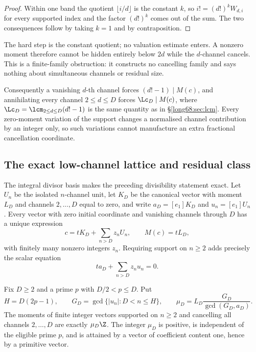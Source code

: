 \begin{proof}
Within one band the quotient $\lfloor i/d\rfloor$ is the constant $k$, so
$i!=(d!)^kW_{d,i}$ for every supported index and the factor $(d!)^k$ comes
out of the sum.  The two consequences follow by taking $k=1$ and by
contraposition.
\end{proof}

\noindent The hard step is the constant quotient; no valuation estimate
enters.  A nonzero moment therefore cannot be hidden entirely below $2d$
while the $d$-channel cancels.  This is a finite-family obstruction: it
constructs no cancelling family and says nothing about simultaneous channels
or residual size.

Consequently a vanishing $d$-th channel forces $(d!-1)\mid M(c)$,
and annihilating every channel $2\le d\le D$ forces $\Lc_D\mid M(c)$, where
$\Lc_D=\lcm_{2\le d\le D}(d!-1)$ is the same quantity as in
\S\ref{long68:sec:lcm}.  Every zero-moment variation of the support changes a
normalised channel contribution by an integer only, so such variations cannot
manufacture an extra fractional cancellation coordinate.

\subsection{The exact low-channel lattice and residual class}

The integral divisor basis makes the preceding divisibility statement exact.
Let $U_n$ be the isolated $n$-channel unit, let $K_D$ be the canonical vector
with moment $L_D$ and channels $2,\ldots,D$ equal to zero, and write
$a_D=[e_1]K_D$ and $u_n=[e_1]U_n$.  Every vector with zero initial coordinate
and vanishing channels through $D$ has a unique expression
\begin{equation}\label{long68:eq:low-channel-basis}
 c=tK_D+\sum_{n>D}z_nU_n,
 \qquad M(c)=tL_D,
\end{equation}
with finitely many nonzero integers $z_n$.  Requiring support on $n\ge2$
adds precisely the scalar equation
\begin{equation}\label{long68:eq:low-channel-support}
 ta_D+\sum_{n>D}z_nu_n=0.
\end{equation}

\begin{theorem}\label{long68:res:moment-ideal}
Fix $D\ge2$ and a prime $p$ with $D/2<p\le D$.  Put
\[
 H=D(2p-1),\qquad
 G_D=\gcd\{|u_n|:D<n\le H\},\qquad
 \mu_D=L_D\frac{G_D}{\gcd(G_D,a_D)}.
\]
The moments of finite integer vectors supported on $n\ge2$ and cancelling all
channels $2,\ldots,D$ are exactly $\mu_D\Z$.  The integer $\mu_D$ is positive,
is independent of the eligible prime $p$, and is attained by a vector of
coefficient content one, hence by a primitive vector.
\end{theorem}

